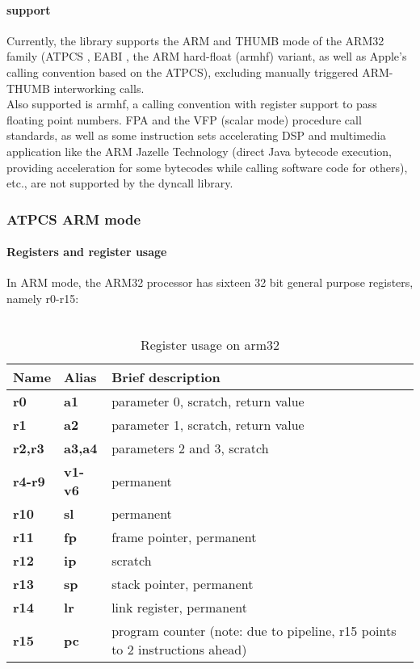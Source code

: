 \paragraph{ support}

Currently, the  library supports the ARM and THUMB mode of the
ARM32 family (ATPCS \cite{ATPCS}, EABI \cite{armeabi}, the ARM hard-float
(armhf) \cite{armeabi} variant, as well as Apple's calling convention based on
the ATPCS), excluding manually triggered ARM-THUMB interworking calls.\\
Also supported is armhf, a calling convention with register support to pass
floating point numbers. FPA and the VFP (scalar mode) procedure call standards,
as well as some instruction sets accelerating DSP and multimedia application
like the ARM Jazelle Technology (direct Java bytecode execution, providing
acceleration for some bytecodes while calling software code for others), etc.,
are not supported by the dyncall library.\\


\subsubsection{ATPCS ARM mode}


\paragraph{Registers and register usage}

In ARM mode, the ARM32 processor has sixteen 32 bit general purpose registers, namely r0-r15:\\
\\
\begin{table}[h]
\begin{tabular*}{0.95\textwidth}{lll}
Name        & Alias       & Brief description\\
\hline
{\bf r0}    & {\bf a1}    & parameter 0, scratch, return value\\
{\bf r1}    & {\bf a2}    & parameter 1, scratch, return value\\
{\bf r2,r3} & {\bf a3,a4} & parameters 2 and 3, scratch\\
{\bf r4-r9} & {\bf v1-v6} & permanent\\
{\bf r10}   & {\bf sl}    & permanent\\
{\bf r11}   & {\bf fp}    & frame pointer, permanent\\
{\bf r12}   & {\bf ip}    & scratch\\
{\bf r13}   & {\bf sp}    & stack pointer, permanent\\
{\bf r14}   & {\bf lr}    & link register, permanent\\
{\bf r15}   & {\bf pc}    & program counter (note: due to pipeline, r15 points to 2 instructions ahead)\\
\end{tabular*}
\caption{Register usage on arm32}
\end{table}

